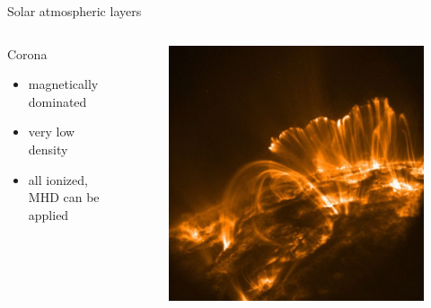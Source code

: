 \documentclass{beamer}
\begin{document}
\begin{frame}[t]{Solar atmospheric layers}
\begin{columns}[c]
    \begin{column}{0.6\textwidth}
		Corona
        \begin{itemize}
					\item magnetically dominated 
					\item very low density
					\item all ionized, MHD can be applied
        \end{itemize}
    \end{column}
    \begin{column}{0.5\textwidth}
			\begin{figure}[t]
			 \centering
			 \includegraphics[scale=0.11]{corona.jpg}
			\end{figure}
    \end{column}
\end{columns}

\end{frame}


\end{document}
